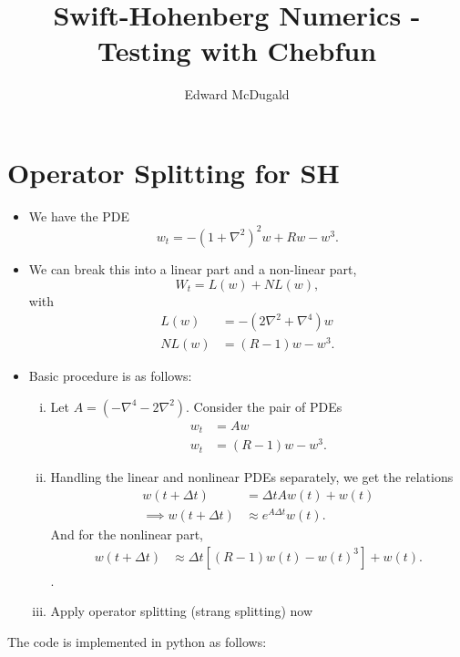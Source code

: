\documentclass[12pt]{article}
\title{Swift-Hohenberg Numerics - Testing with Chebfun}
\author{Edward McDugald}
\begin{document}
\maketitle
\section{Operator Splitting for SH}
\begin{itemize}
        \item We have the PDE
        \[
            w_t = -(1+\nabla^2)^2w + Rw - w^3.
        \]
    \item
        We can break this into a linear part and a non-linear part,
        \[
            W_t = L(w) + NL(w),
        \]
        with
        \begin{align*}
            L(w) &= -(2\nabla^2+\nabla^4)w\\
            NL(w) &=  (R-1)w- w^3.
        \end{align*}
         \item
        Basic procedure is as follows:
        \begin{enumerate}[(i)]
            \item Let $A = (-\nabla^4-2\nabla^2)$. Consider the pair of PDEs
                \begin{align*}
                    w_t &= Aw\\
                    w_t &= (R-1)w-w^3.
                \end{align*}
            \item
                Handling the linear and nonlinear PDEs separately, we get the relations
                \begin{align*}
                    w(t+\Delta t) &= \Delta t Aw(t)+w(t)\\
                    \implies w(t+\Delta t) &\approx e^{A\Delta t}w(t).
                \end{align*}
                And for the nonlinear part,
                \begin{align*}
                    w(t+\Delta t) &\approx \Delta t \left[(R-1)w(t)-w(t)^3\right]+w(t).
                \end{align*}.
            \item Apply operator splitting (strang splitting) now
            \end{enumerate}
    \end{itemize}
    The code is implemented in python as follows:
\end{document}
